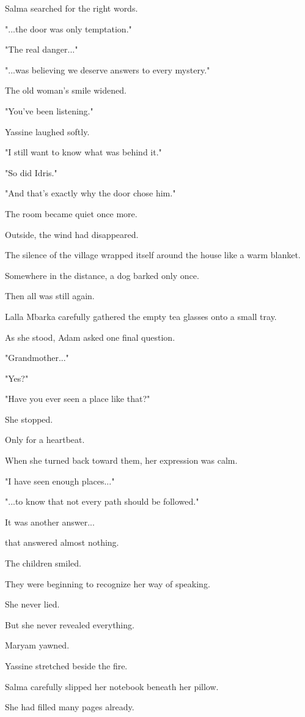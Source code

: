 \documentclass[12pt,openany]{book}
\begin{document}
Salma searched for the right words.

"...the door was only temptation."

"The real danger..."

"...was believing we deserve answers to every mystery."

The old woman's smile widened.

"You've been listening."

Yassine laughed softly.

"I still want to know what was behind it."

"So did Idris."

"And that's exactly why the door chose him."

The room became quiet once more.

Outside, the wind had disappeared.

The silence of the village wrapped itself around the house like a warm blanket.

Somewhere in the distance, a dog barked only once.

Then all was still again.

Lalla Mbarka carefully gathered the empty tea glasses onto a small tray.

As she stood, Adam asked one final question.

"Grandmother..."

"Yes?"

"Have you ever seen a place like that?"

She stopped.

Only for a heartbeat.

When she turned back toward them, her expression was calm.

"I have seen enough places..."

"...to know that not every path should be followed."

It was another answer...

that answered almost nothing.

The children smiled.

They were beginning to recognize her way of speaking.

She never lied.

But she never revealed everything.

Maryam yawned.

Yassine stretched beside the fire.

Salma carefully slipped her notebook beneath her pillow.

She had filled many pages already.
\end{document}

